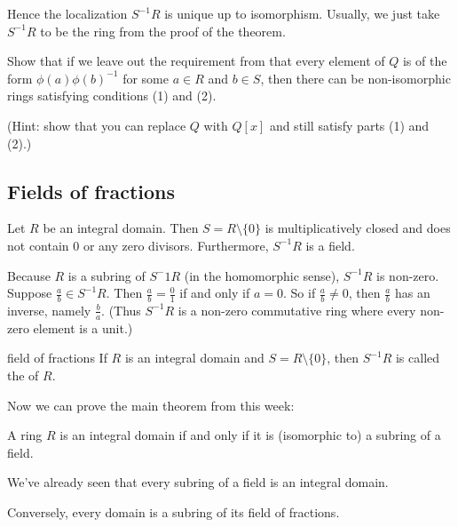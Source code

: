 \documentclass[12pt,letterpaper]{report}
\begin{document}
Hence the localization $S^{-1}R$ is unique up to isomorphism.
Usually, we just take $S^{-1}R$ to be the ring from the proof of the theorem.

\begin{exer}{}{}
  Show that if we leave out the requirement from that every element of $Q$ is of the form
  $\phi(a)\phi(b)^{-1}$ for some $a \in R$ and $b \in S$, then there can be non-isomorphic rings
  satisfying conditions (1) and (2).

  (Hint: show that you can replace $Q$ with $Q[x]$ and still satisfy parts (1) and (2).)
\end{exer}

\pagebreak
\subsection{Fields of fractions}

\begin{lem}{}{}
  Let $R$ be an integral domain.
  Then $S = R \setminus \{0\}$ is multiplicatively closed and does not contain 0 or any zero
  divisors.
  Furthermore, $S^{-1}R$ is a field.
\end{lem}

\begin{thmproof}
  Because $R$ is a subring of $S^-{1}R$ (in the homomorphic sense), $S^{-1}R$ is non-zero.
  Suppose $\frac{a}{b} \in S^{-1}R$.
  Then $\frac{a}{b} = \frac{0}{1}$ if and only if $a = 0$.
  So if $\frac{a}{b} \neq 0$, then $\frac{a}{b}$ has an inverse, namely $\frac{b}{a}$.
  (Thus $S^{-1}R$ is a non-zero commutative ring where every non-zero element is a unit.)
\end{thmproof}

\begin{defn}{field of fractions}{}
  If $R$ is an integral domain and $S = R \setminus \{0\}$, then $S^{-1}R$ is called the
   of $R$.
\end{defn}

Now we can prove the main theorem from this week:

\begin{thm}{}{}
  A ring $R$ is an integral domain if and only if it is (isomorphic to) a subring of a field.
\end{thm}

\begin{thmproof}
  We've already seen that every subring of a field is an integral domain.

  Conversely, every domain is a subring of its field of fractions.
\end{thmproof}
\end{document}
